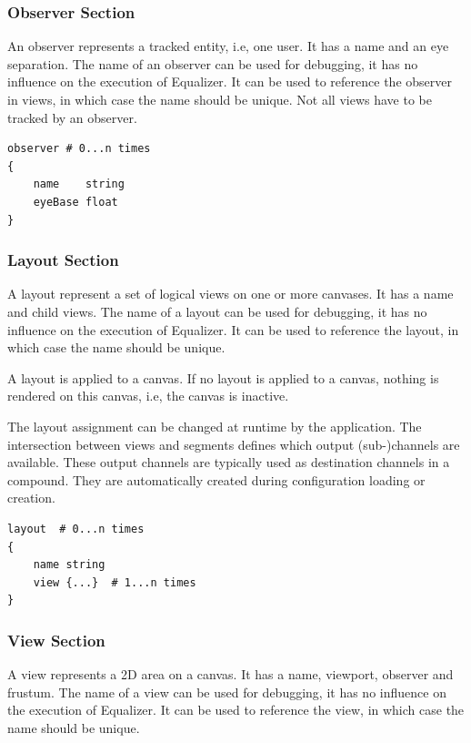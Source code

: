 \documentclass[10pt,a4]{scrartcl}
\begin{document}
\subsubsection{Observer Section}

An observer represents a tracked entity, i.e, one user. It has a name
and an eye separation. The name of an observer can be used for
debugging, it has no influence on the execution of Equalizer. It can be
used to reference the observer in views, in which case the name should
be unique. Not all views have to be tracked by an observer.

{\footnotesize\begin{lstlisting}
observer # 0...n times
{
    name    string
    eyeBase float
}
\end{lstlisting}}

\subsubsection{Layout Section}

A layout represent a set of logical views on one or more canvases. It
has a name and child views. The name of a layout can be used for
debugging, it has no influence on the execution of Equalizer. It can be
used to reference the layout, in which case the name should be unique.

A layout is applied to a canvas. If no layout is applied to a canvas,
nothing is rendered on this canvas, i.e, the canvas is inactive.

The layout assignment can be changed at runtime by the application. The
intersection between views and segments defines which output
(sub-)channels are available. These output channels are typically used
as destination channels in a compound. They are automatically created
during configuration loading or creation.

{\footnotesize\begin{lstlisting}
layout  # 0...n times
{
    name string
    view {...}  # 1...n times
}
\end{lstlisting}}

\subsubsection{View Section}

A view represents a 2D area on a canvas. It has a name, viewport,
observer and frustum. The name of a view can be used for debugging, it
has no influence on the execution of Equalizer. It can be used to
reference the view, in which case the name should be unique.
\end{document}
